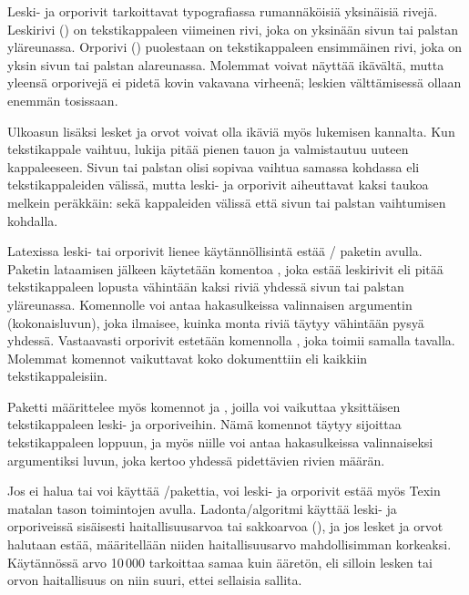 Leski- ja orporivit tarkoittavat typografiassa rumannäköisiä yksinäisiä
rivejä. Leskirivi () on tekstikappaleen viimeinen rivi,
joka on yksinään sivun tai palstan yläreunassa. Orporivi
() puolestaan on tekstikappaleen ensimmäinen rivi, joka
on yksin sivun tai palstan alareunassa. Molemmat voivat näyttää
ikävältä, mutta yleensä orporivejä ei pidetä kovin vakavana virheenä;
leskien välttämisessä ollaan enemmän tosissaan.

Ulkoasun lisäksi lesket ja orvot voivat olla ikäviä myös lukemisen
kannalta. Kun tekstikappale vaihtuu, lukija pitää pienen tauon ja
valmistautuu uuteen kappaleeseen. Sivun tai palstan olisi sopivaa
vaihtua samassa kohdassa eli tekstikappaleiden välissä, mutta leski- ja
orporivit aiheuttavat kaksi taukoa melkein peräkkäin: sekä kappaleiden
välissä että sivun tai palstan vaihtumisen kohdalla.

Latexissa leski- tai orporivit lienee käytännöllisintä estää
\-/ paketin avulla. Paketin lataamisen jälkeen
käytetään komentoa , joka estää leskirivit eli
pitää tekstikappaleen lopusta vähintään kaksi riviä yhdessä sivun tai
palstan yläreunassa. Komennolle voi antaa hakasulkeissa valinnaisen
argumentin (kokonaisluvun), joka ilmaisee, kuinka monta riviä täytyy
vähintään pysyä yhdessä. Vastaavasti orporivit estetään komennolla
, joka toimii samalla tavalla. Molemmat komennot
vaikuttavat koko dokumenttiin eli kaikkiin tekstikappaleisiin.

\begin{koodilohkosis}
\usepackage{nowidow}
\setnowidow   %
\setnoclub    %
\end{koodilohkosis}

\noindent
Paketti  määrittelee myös komennot 
ja , joilla voi vaikuttaa yksittäisen tekstikappaleen
leski- ja orporiveihin. Nämä komennot täytyy sijoittaa tekstikappaleen
loppuun, ja myös niille voi antaa hakasulkeissa valinnaiseksi
argumentiksi luvun, joka kertoo yhdessä pidettävien rivien määrän.

Jos ei halua tai voi käyttää \-/pakettia, voi leski- ja
orporivit estää myös Texin matalan tason toimintojen avulla.
Ladonta\-/algoritmi käyttää leski- ja orporiveissä sisäisesti
haitallisuusarvoa tai sakkoarvoa (), ja jos lesket ja
orvot halutaan estää, määritellään niiden haitallisuusarvo
mahdollisimman korkeaksi. Käytännössä arvo 10\,000 tarkoittaa samaa kuin
ääretön, eli silloin lesken tai orvon haitallisuus on niin suuri, ettei
sellaisia sallita.

